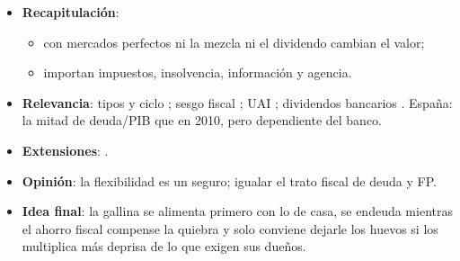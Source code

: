 \documentclass{article}
\begin{document}
\begin{columnas}
\begin{itemize}
\item \textbf{Recapitulación}:
  \begin{itemize}
  \item con mercados perfectos ni la mezcla ni el dividendo cambian el valor;
  \item importan impuestos, insolvencia, información y agencia.
  \end{itemize}
\item \textbf{Relevancia}: tipos y ciclo ; sesgo fiscal ; UAI ; dividendos bancarios . España: la mitad de deuda/PIB que en 2010, pero dependiente del banco.
\item \textbf{Extensiones}:     .
\item \textbf{Opinión}: la flexibilidad es un seguro; igualar el trato fiscal de deuda y FP.
\item \textbf{Idea final}: la gallina se alimenta primero con lo de casa, se endeuda mientras el ahorro fiscal compense la quiebra y solo conviene dejarle los huevos si los multiplica más deprisa de lo que exigen sus dueños.
\end{itemize}


\end{columnas}
\end{document}
